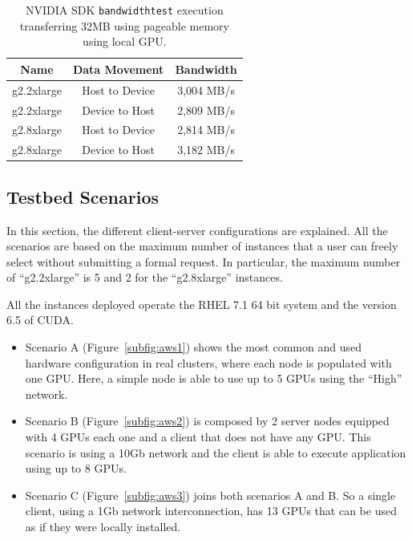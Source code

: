 \documentclass[a4paper,twoside]{article}
\begin{document}
\begin{table}[htb]
\renewcommand{\arraystretch}{1.3}
\caption{NVIDIA SDK {\tt bandwidthtest} execution transferring 32MB using pageable memory using local GPU.}
\label{table:bwt}
\tabcolsep=0.09cm
\begin{center}\begin{tabular}{ccc}
Name &  Data Movement & Bandwidth \\ \hline \hline
g2.2xlarge & Host to Device & 3,004 MB/s \\ \hline
g2.2xlarge & Device to Host & 2,809 MB/s\\ \hline
g2.8xlarge & Host to Device & 2,814 MB/s\\ \hline
g2.8xlarge & Device to Host & 3,182 MB/s\\ \hline
\end{tabular}\end{center}\end{table}

\subsection{Testbed Scenarios}
In this section, the different client-server configurations 
are explained. All the scenarios are based on the maximum number of instances 
that a user can freely select without submitting a formal request. 
In particular, the maximum number of ``g2.2xlarge'' is 5 and 2 for the ``g2.8xlarge'' instances.

All the instances deployed operate the RHEL 7.1 64 bit system and the version 6.5 of CUDA. 

\begin{itemize}
\item Scenario A (Figure~\ref{subfig:aws1}) shows the most common 
and used hardware configuration in real clusters, where each node is 
populated with one GPU. Here, a simple node is able to use up to 5 GPUs 
using the ``High'' network. 

\item Scenario B (Figure~\ref{subfig:aws2}) is composed by 2 server nodes equipped 
with 4 GPUs each one and a client that does not have any GPU. This scenario is using 
a 10Gb network and the client is able to execute application using up to 8 GPUs.

\item Scenario C (Figure~\ref{subfig:aws3}) joins both scenarios A and B. So a 
single client, using a 1Gb network interconnection, has 13 GPUs that can be used as if they were locally installed.
\end{itemize}
\end{document}
